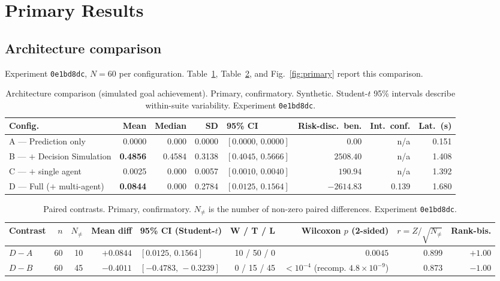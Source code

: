 \documentclass[conference]{IEEEtran}
\newcommand{\Nnz}{N_{\neq}}                 %
\newcommand{\rzn}{r=Z/\sqrt{\Nnz}}
\newcommand{\expid}[1]{\texttt{#1}}
\begin{document}
\section{Primary Results}
\label{sec:results}

\subsection{Architecture comparison}
\label{sec:archcmp}
Experiment \expid{0e1bd8dc}, $N = 60$ per configuration. Table~\ref{tab:arch},
Table~\ref{tab:paired}, and Fig.~\ref{fig:primary} report this comparison.

\begin{table}[!t]
\caption{Architecture comparison (simulated goal achievement). Primary,
confirmatory. Synthetic. Student-$t$ 95\% intervals describe within-suite
variability. Experiment \expid{0e1bd8dc}.}
\label{tab:arch}
\centering
\renewcommand{\arraystretch}{1.2}
\begin{tabular}{@{}lrrrlrrr@{}}
\toprule
Config. & Mean & Median & SD & 95\% CI & Risk-disc.\ ben. & Int.\ conf. & Lat.\ (s)\\
\midrule
A --- Prediction only        & 0.0000 & 0.000 & 0.0000 & $[0.0000,\,0.0000]$ & $0.00$      & n/a   & 0.151\\
B --- $+$ Decision Simulation& \textbf{0.4856} & 0.4584 & 0.3138 & $[0.4045,\,0.5666]$ & $2508.40$   & n/a   & 1.408\\
C --- $+$ single agent       & 0.0025 & 0.000 & 0.0057 & $[0.0010,\,0.0040]$ & $190.94$    & n/a   & 1.392\\
D --- Full ($+$ multi-agent) & \textbf{0.0844} & 0.000 & 0.2784 & $[0.0125,\,0.1564]$ & $-2614.83$  & 0.139 & 1.680\\
\bottomrule
\end{tabular}
\end{table}

\begin{table}[!t]
\caption{Paired contrasts. Primary, confirmatory. $\Nnz$ is the number of
non-zero paired differences. Experiment \expid{0e1bd8dc}.}
\label{tab:paired}
\centering
\renewcommand{\arraystretch}{1.2}
\begin{tabular}{@{}lrrrlrrrr@{}}
\toprule
Contrast & $n$ & $\Nnz$ & Mean diff & 95\% CI (Student-$t$) & W / T / L & Wilcoxon $p$ (2-sided) & $\rzn$ & Rank-bis.\\
\midrule
$D - A$ & 60 & 10 & \textbf{$+0.0844$} & $[0.0125,\,0.1564]$ & 10 / 50 / 0 & $0.0045$ & 0.899 & $+1.00$\\
$D - B$ & 60 & 45 & \textbf{$-0.4011$} & $[-0.4783,\,-0.3239]$ & 0 / 15 / 45 & $<10^{-4}$ (recomp. $4.8\times10^{-9}$) & 0.873 & $-1.00$\\
\bottomrule
\end{tabular}
\end{table}
\end{document}
